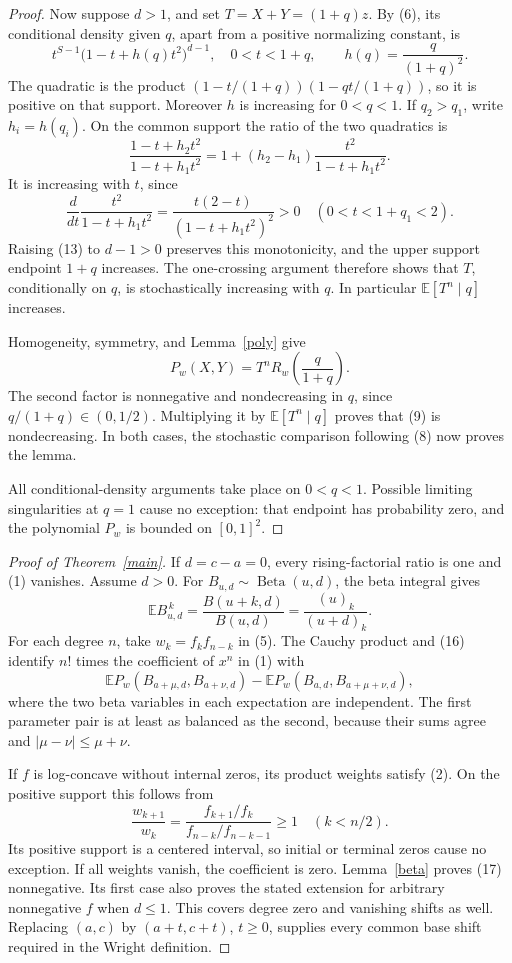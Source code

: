 \documentclass[10pt]{article}
\newcommand{\E}{\mathbb E}
\newcommand{\Be}{\operatorname{Beta}}
\begin{document}
\begin{proof}
Now suppose \(d>1\), and set \(T=X+Y=(1+q)z\). By (6), its conditional
density given \(q\), apart from a positive normalizing constant, is
\[
 t^{S-1}\bigl(1-t+h(q)t^2\bigr)^{d-1},
 \quad 0<t<1+q,\qquad h(q)=\frac{q}{(1+q)^2}.        \tag{12}
\]
The quadratic is the product
\((1-t/(1+q))(1-qt/(1+q))\), so it is positive on that support.
Moreover \(h\) is increasing for \(0<q<1\). If \(q_2>q_1\), write
\(h_i=h(q_i)\). On the common support the ratio of the two quadratics is
\[
 \frac{1-t+h_2t^2}{1-t+h_1t^2}
 =1+(h_2-h_1)\frac{t^2}{1-t+h_1t^2}.                \tag{13}
\]
It is increasing with \(t\), since
\[
 \frac{d}{dt}\frac{t^2}{1-t+h_1t^2}
 =\frac{t(2-t)}{(1-t+h_1t^2)^2}>0
 \quad(0<t<1+q_1<2).                              \tag{14}
\]
Raising (13) to \(d-1>0\) preserves this monotonicity, and the upper
support endpoint \(1+q\) increases. The one-crossing argument therefore
shows that \(T\), conditionally on \(q\), is stochastically increasing
with \(q\). In particular \(\E[T^n\mid q]\) increases.

Homogeneity, symmetry, and Lemma~\ref{poly} give
\[
 P_w(X,Y)=T^nR_w\!\left(\frac{q}{1+q}\right).
 \tag{15}
\]
The second factor is nonnegative and nondecreasing in \(q\), since
\(q/(1+q)\in(0,1/2)\). Multiplying it by
\(\E[T^n\mid q]\) proves that (9) is nondecreasing. In both cases,
the stochastic comparison following (8) now proves the lemma.

All conditional-density arguments take place on \(0<q<1\). Possible
limiting singularities at \(q=1\) cause no exception: that endpoint has
probability zero, and the polynomial \(P_w\) is bounded on \([0,1]^2\).
\end{proof}

\begin{proof}[Proof of Theorem~\ref{main}]
If \(d=c-a=0\), every rising-factorial ratio is one and (1) vanishes.
Assume \(d>0\). For \(B_{u,d}\sim\Be(u,d)\), the beta integral gives
\[
 \E B_{u,d}^{\,k}=\frac{B(u+k,d)}{B(u,d)}
                =\frac{(u)_k}{(u+d)_k}.             \tag{16}
\]
For each degree \(n\), take \(w_k=f_kf_{n-k}\) in (5). The Cauchy
product and (16) identify \(n!\) times the coefficient of \(x^n\) in
(1) with
\[
 \E P_w(B_{a+\mu,d},B_{a+\nu,d})
 -\E P_w(B_{a,d},B_{a+\mu+\nu,d}),                  \tag{17}
\]
where the two beta variables in each expectation are independent.
The first parameter pair is at least as balanced as the second,
because their sums agree and \(|\mu-\nu|\le\mu+\nu\).

If \(f\) is log-concave without internal zeros, its product weights
satisfy (2). On the positive support this follows from
\[
 \frac{w_{k+1}}{w_k}
 =\frac{f_{k+1}/f_k}{f_{n-k}/f_{n-k-1}}\ge1
 \quad(k<n/2).                                    \tag{18}
\]
Its positive support is a centered interval, so initial or terminal
zeros cause no exception. If all weights vanish, the coefficient is zero.
Lemma~\ref{beta} proves (17) nonnegative. Its first case also proves
the stated extension for arbitrary nonnegative \(f\) when \(d\le1\).
This covers degree zero and vanishing shifts as well. Replacing
\((a,c)\) by \((a+t,c+t)\), \(t\ge0\), supplies every common base
shift required in the Wright definition.
\end{proof}
\end{document}
